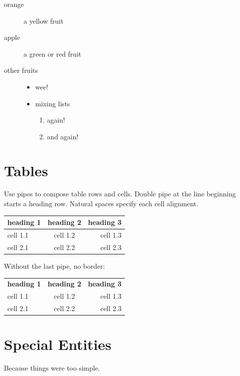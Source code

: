 \documentclass[11pt,a4paper]{article}
\begin{document}
\begin{description}
\item[orange]
  a yellow fruit
\item[apple]
  a green or red fruit
\item[other fruits]
  \begin{itemize}
  \item wee!
  \item mixing lists
    \begin{enumerate}
    \item again!
    \item and again!
    \end{enumerate}
  \end{itemize}
\end{description}


\section*{Tables}
Use pipes to compose table rows and cells.
Double pipe at the line beginning starts a heading row.
Natural spaces specify each cell alignment.

\begin{center}\begin{tabular}{|l|c|r|}
\hline \textbf{heading 1} & \textbf{heading 2} & \textbf{heading 3} \\
\hline cell 1.1 & cell 1.2 & cell 1.3 \\
\hline cell 2.1 & cell 2.2 & cell 2.3 \\
\hline \end{tabular}\end{center}


Without the last pipe, no border:

\begin{center}\begin{tabular}{lcr}
\textbf{heading 1} & \textbf{heading 2} & \textbf{heading 3} \\
cell 1.1 & cell 1.2 & cell 1.3 \\
cell 2.1 & cell 2.2 & cell 2.3 \\
\end{tabular}\end{center}



\section*{Special Entities}
Because things were too simple.
\end{document}
